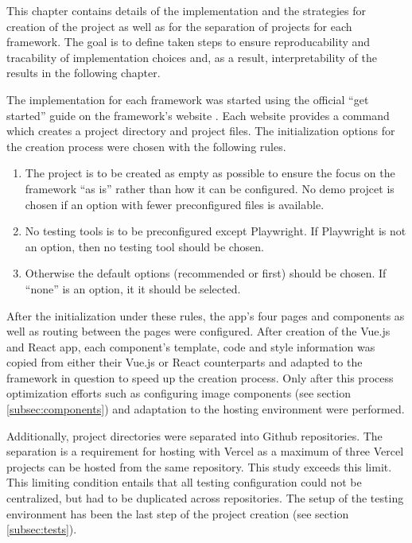 \documentclass[a4paper, 12pt]{article}
\begin{document}
This chapter contains details of the implementation and the strategies for creation of the project as well as for the separation of projects for each framework.
The goal is to define taken steps to ensure reproducability and tracability of implementation choices and, as a result, interpretability of the results in the following chapter.

The implementation for each framework was started using the official \enquote{get started} guide on the framework's website \citep{AngularGetStarted,AstroGetStarted,NextGetStarted,NuxtGetStarted,ReactGetStarted,SvelteGetStarted,VueGetStarted}.
Each website provides a command which creates a project directory and project files.
The initialization options for the creation process were chosen with the following rules.

\begin{enumerate}
  \item The project is to be created as empty as possible to ensure the focus on the framework \enquote{as is} rather than how it can be configured.
  No demo projcet is chosen if an option with fewer preconfigured files is available.
  \item No testing tools is to be preconfigured except Playwright.
  If Playwright is not an option, then no testing tool should be chosen.
  \item Otherwise the default options (recommended or first) should be chosen.
  If \enquote{none} is an option, it it should be selected.
\end{enumerate}

After the initialization under these rules, the app's four pages and components as well as routing between the pages were configured.
After creation of the Vue.js and React app, each component's template, code and style information was copied from either their Vue.js or React counterparts and adapted to the framework in question to speed up the creation process.
Only after this process optimization efforts such as configuring image components (see section \ref{subsec:components}) and adaptation to the hosting environment were performed.

Additionally, project directories were separated into Github repositories.
The separation is a requirement for hosting with Vercel as a maximum of three Vercel projects can be hosted from the same repository.
This study exceeds this limit.
This limiting condition entails that all testing configuration could not be centralized, but had to be duplicated across repositories.
The setup of the testing environment has been the last step of the project creation (see section \ref{subsec:tests}).
\end{document}
